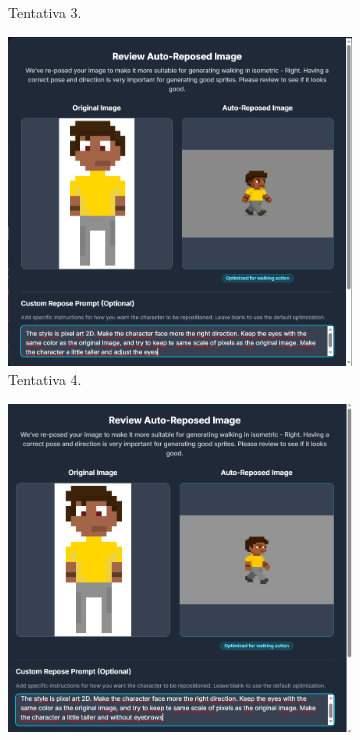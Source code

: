\begin{figure}[htbp]
\begin{subfigure}{0.45\linewidth}
        \caption{\small Tentativa 3.}
        \label{fig:godmodAIrepose3}
    \end{subfigure}
        \begin{subfigure}{0.45\linewidth}
        \includegraphics[width=1\linewidth]{figs/godmodAI/tela auto repose 4.PNG}
        \caption{\small Tentativa 4.}
        \label{fig:godmodAIrepose4}
    \end{subfigure}
        \begin{subfigure}{0.45\linewidth}
        \includegraphics[width=1\linewidth]{figs/godmodAI/tela auto repose 5.PNG}

\end{subfigure}
\end{figure}

